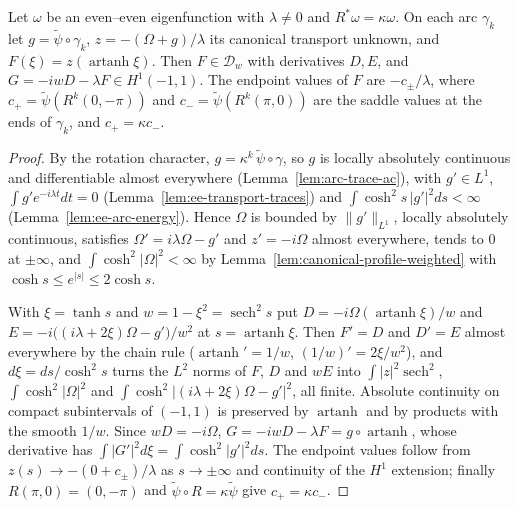 \begin{lemma}
\label{lem:ee-boundary-regularity}
\leanok
Let $\omega$ be an even--even eigenfunction with $\lambda\ne0$ and $R^*\omega=\kappa\omega$. On each
arc $\gamma_k$ let $g=\tilde\psi\circ\gamma_k$, $z=-(\Omega+g)/\lambda$ its canonical transport
unknown, and $F(\xi)=z(\operatorname{artanh}\xi)$. Then $F\in\mathcal D_w$ with derivatives
$D,E$, and $G=-iwD-\lambda F\in H^1(-1,1)$. The endpoint values of $F$ are $-c_\pm/\lambda$,
where $c_+=\tilde\psi(R^k(0,-\pi))$ and $c_-=\tilde\psi(R^k(\pi,0))$ are the saddle values at
the ends of $\gamma_k$, and $c_+=\kappa c_-$.
\end{lemma}

\begin{proof}
\leanok
By the rotation character, $g=\kappa^k\,\tilde\psi\circ\gamma$, so $g$ is locally absolutely
continuous and differentiable almost everywhere (Lemma~\ref{lem:arc-trace-ac}), with
$g'\in L^1$, $\int g'e^{-i\lambda t}dt=0$ (Lemma~\ref{lem:ee-transport-traces}) and
$\int\cosh^2s\,|g'|^2ds<\infty$ (Lemma~\ref{lem:ee-arc-energy}). Hence
$\Omega$ is bounded by $\|g'\|_{L^1}$, locally absolutely continuous, satisfies
$\Omega'=i\lambda\Omega-g'$ and $z'=-i\Omega$ almost everywhere, tends to $0$ at $\pm\infty$,
and $\int\cosh^2|\Omega|^2<\infty$ by Lemma~\ref{lem:canonical-profile-weighted}
with $\cosh s\le e^{|s|}\le2\cosh s$.

With $\xi=\tanh s$ and $w=1-\xi^2=\operatorname{sech}^2s$ put
$D=-i\Omega(\operatorname{artanh}\xi)/w$ and
$E=-i\bigl((i\lambda+2\xi)\Omega-g'\bigr)/w^2$ at $s=\operatorname{artanh}\xi$. Then $F'=D$ and
$D'=E$ almost everywhere by the chain rule ($\operatorname{artanh}'=1/w$, $(1/w)'=2\xi/w^2$), and
$d\xi=ds/\cosh^2s$ turns the $L^2$ norms of $F$, $D$ and $wE$ into $\int|z|^2\operatorname{sech}^2$,
$\int\cosh^2|\Omega|^2$ and $\int\cosh^2|(i\lambda+2\xi)\Omega-g'|^2$, all finite. Absolute
continuity on compact subintervals of $(-1,1)$ is preserved by $\operatorname{artanh}$ and by
products with the smooth $1/w$. Since $wD=-i\Omega$, $G=-iwD-\lambda F=g\circ\operatorname{artanh}$,
whose derivative has $\int|G'|^2d\xi=\int\cosh^2|g'|^2ds$. The endpoint values follow from
$z(s)\to-(0+c_\pm)/\lambda$ as $s\to\pm\infty$ and continuity of the $H^1$ extension; finally
$R(\pi,0)=(0,-\pi)$ and $\tilde\psi\circ R=\kappa\tilde\psi$ give $c_+=\kappa c_-$.
\end{proof}

